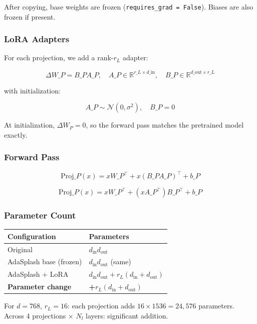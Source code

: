 After copying, base weights are frozen (\texttt{requires\_grad = False}). Biases are 
also frozen if present.

\subsubsection{LoRA Adapters}

For each projection, we add a rank-$r_L$ adapter:

\[
\Delta W\_P = B\_P A\_P, \quad A\_P \in \mathbb{R}^{r\_L \times d\_\text{in}}, \quad B\_P \in \mathbb{R}^{d\_\text{out} \times r\_L}
\tag{4.3}
\]

with initialization:

\[
A\_P \sim \mathcal{N}(0, \sigma^2), \quad B\_P = 0
\tag{4.4}
\]

At initialization, $\Delta W_P = 0$, so the forward pass matches the 
pretrained model exactly.

\subsubsection{Forward Pass}

\[
\text{Proj}\_P(x) = x W\_P^\top + x (B\_P A\_P)^\top + b\_P
\tag{4.5}
\]

\[
\text{Proj}\_P(x) = x W\_P^\top + (x A\_P^\top) B\_P^\top + b\_P
\tag{4.6}
\]

\subsubsection{Parameter Count}

\begin{table}[H]
\centering
\small
\begin{tabular}{ll}
\toprule
\textbf{Configuration} & \textbf{Parameters} \\
\midrule
Original & $d_\text{in} d_\text{out}$ \\
AdaSplash base (frozen) & $d_\text{in} d_\text{out}$ (same) \\
AdaSplash + LoRA & $d_\text{in} d_\text{out} + r_L (d_\text{in} + d_\text{out})$ \\
\textbf{Parameter change} & \textbf{+$r_L (d_\text{in} + d_\text{out})$} \\
\bottomrule
\end{tabular}
\end{table}

For $d = 768$, $r_L = 16$: each projection adds $16 \times 1536 = 24{,}576$ 
parameters. Across 4 projections $\times$ $N_l$ layers: significant addition.

